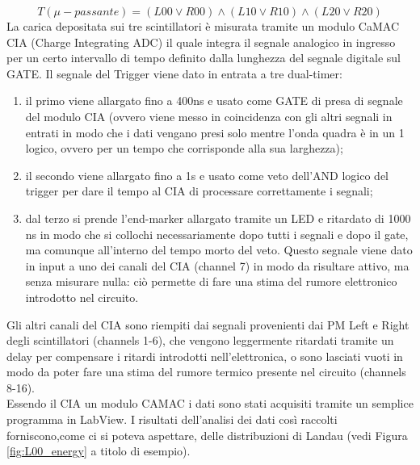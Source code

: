 \begin{equation}
T (\mu-passante)=(L00 \lor R00) \land (L10 \lor R10) \land (L20 \lor R20)
\end{equation}
La carica depositata sui tre scintillatori \`e misurata tramite un modulo CaMAC CIA (Charge Integrating ADC) il quale integra il segnale analogico in ingresso per un certo intervallo di tempo definito dalla lunghezza del segnale digitale sul GATE. Il segnale del Trigger viene dato in entrata a tre dual-timer:
\begin{enumerate}
	\item il primo viene allargato fino a 400ns e usato come GATE di presa di segnale del modulo CIA (ovvero viene messo in coincidenza con gli altri segnali in entrati in modo che i dati vengano presi solo mentre l'onda quadra \`e in un 1 logico, ovvero per un tempo che corrisponde alla sua larghezza);
	\item il secondo viene allargato fino a 1s e usato come veto dell'AND logico del trigger per dare il tempo al CIA di processare correttamente i segnali;
	\item dal terzo si prende l'end-marker allargato tramite un LED e ritardato di 1000 ns in modo che si collochi necessariamente dopo tutti i segnali e dopo il gate, ma comunque all'interno del tempo morto del veto. Questo segnale viene dato in input a uno dei canali del CIA (channel 7) in modo da risultare attivo, ma senza misurare nulla: ci\`o permette di fare una stima del rumore elettronico introdotto nel circuito.
\end{enumerate}

Gli altri canali del CIA sono riempiti dai segnali provenienti dai PM Left e Right degli scintillatori (channels 1-6), che vengono leggermente ritardati tramite un delay per compensare i ritardi introdotti nell'elettronica, o sono lasciati vuoti in modo da poter fare una stima del rumore termico presente nel circuito (channels 8-16).\\
Essendo il CIA un modulo CAMAC i dati sono stati acquisiti tramite un semplice programma in LabView. I risultati dell'analisi dei dati cos\`i raccolti forniscono,come ci si poteva aspettare, delle distribuzioni di Landau (vedi Figura \ref{fig:L00_energy} a titolo di esempio). 

